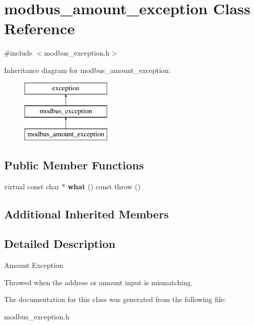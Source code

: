 \hypertarget{classmodbus__amount__exception}{}\section{modbus\+\_\+amount\+\_\+exception Class Reference}
\label{classmodbus__amount__exception}


{\ttfamily \#include $<$modbus\+\_\+exception.\+h$>$}

Inheritance diagram for modbus\+\_\+amount\+\_\+exception\+:\begin{figure}[H]
\begin{center}
\leavevmode
\includegraphics[height=3.000000cm]{classmodbus__amount__exception}
\end{center}
\end{figure}
\subsection*{Public Member Functions}
\begin{DoxyCompactItemize}
\item 
\mbox{\label{classmodbus__amount__exception_ad96c75d34b145f93f2c2a2bd59c06c7e}} 
virtual const char $\ast$ {\bfseries what} () const  throw ()
\end{DoxyCompactItemize}
\subsection*{Additional Inherited Members}


\subsection{Detailed Description}
Amount Exception

Throwed when the address or amount input is mismatching. 

The documentation for this class was generated from the following file\+:\begin{DoxyCompactItemize}
\item 
modbus\+\_\+exception.\+h\end{DoxyCompactItemize}
